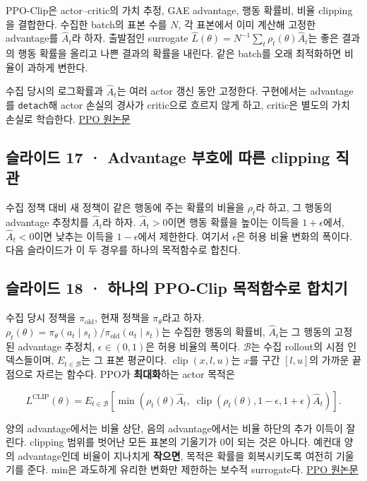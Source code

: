 \documentclass[11pt,a4paper]{article}
\begin{document}
PPO-Clip은 actor–critic의 가치 추정, GAE advantage, 행동 확률비, 비율 clipping을 결합한다. 수집한 batch의 표본 수를 $N$, 각 표본에서 이미 계산해 고정한 advantage를 $\widehat A_t$라 하자. 출발점인 surrogate $\widehat L(\theta)=N^{-1}\sum_t\rho_t(\theta)\widehat A_t$는 좋은 결과의 행동 확률을 올리고 나쁜 결과의 확률을 내린다. 같은 batch를 오래 최적화하면 비율이 과하게 변한다.\par

수집 당시의 로그확률과 $\widehat A_t$는 여러 actor 갱신 동안 고정한다. 구현에서는 advantage를 \texttt{detach}해 actor 손실의 경사가 critic으로 흐르지 않게 하고, critic은 별도의 가치 손실로 학습한다. \href{https://arxiv.org/abs/1707.06347}{PPO 원논문}\par

\subsection{슬라이드 17 · Advantage 부호에 따른 clipping 직관}

수집 정책 대비 새 정책이 같은 행동에 주는 확률의 비율을 $\rho_t$라 하고, 그 행동의 advantage 추정치를 $\widehat A_t$라 하자. $\widehat A_t>0$이면 행동 확률을 높이는 이득을 $1+\epsilon$에서, $\widehat A_t<0$이면 낮추는 이득을 $1-\epsilon$에서 제한한다. 여기서 $\epsilon$은 허용 비율 변화의 폭이다. 다음 슬라이드가 이 두 경우를 하나의 목적함수로 합친다.\par

\subsection{슬라이드 18 · 하나의 PPO-Clip 목적함수로 합치기}

수집 당시 정책을 $\pi_{\mathrm{old}}$, 현재 정책을 $\pi_\theta$라고 하자. $\rho_t(\theta)=\pi_\theta(a_t\mid s_t)/\pi_{\mathrm{old}}(a_t\mid s_t)$는 수집한 행동의 확률비, $\widehat A_t$는 그 행동의 고정된 advantage 추정치, $\epsilon\in(0,1)$은 허용 비율의 폭이다. $\mathcal B$는 수집 rollout의 시점 인덱스들이며, $E_{t\in\mathcal B}$는 그 표본 평균이다. $\operatorname{clip}(x,l,u)$는 $x$를 구간 $[l,u]$의 가까운 끝점으로 자르는 함수다. PPO가 \textbf{최대화}하는 actor 목적은\par

\[
L^{\mathrm{CLIP}}(\theta)=
E_{t\in\mathcal B}
\left[
\min\left(
\rho_t(\theta)\widehat A_t,\;
\operatorname{clip}(\rho_t(\theta),1-\epsilon,1+\epsilon)\widehat A_t
\right)
\right].
\]

양의 advantage에서는 비율 상단, 음의 advantage에서는 비율 하단의 추가 이득이 잘린다. clipping 범위를 벗어난 모든 표본의 기울기가 0이 되는 것은 아니다. 예컨대 양의 advantage인데 비율이 지나치게 \textbf{작으면}, 목적은 확률을 회복시키도록 여전히 기울기를 준다. min은 과도하게 유리한 변화만 제한하는 보수적 surrogate다. \href{https://arxiv.org/abs/1707.06347}{PPO 원논문}\par
\end{document}
